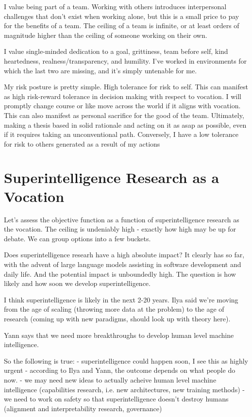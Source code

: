 \documentclass{article}
\begin{document}
I value being part of a team. Working with others introduces interpersonal challenges that don't exist when working alone, but this is a small price to pay for the benefits of a team. The ceiling of a team is infinite, or at least orders of magnitude higher than the ceiling of someone working on their own.

I value single-minded dedication to a goal, grittiness, team before self, kind heartedness, realness/transparency, and humility. I've worked in environments for which the last two are missing, and it's simply untenable for me.

My risk posture is pretty simple. High tolerance for risk to self. This can manifest as high risk-reward tolerance in decision making with respect to vocation. I will promptly change course or like move across the world if it aligns with vocation. This can also manifest as personal sacrifice for the good of the team. Ultimately, making a thesis based in solid rationale and acting on it as asap as possible, even if it requires taking an unconventional path. Conversely, I have a low tolerance for risk to others generated as a result of my actions

\section*{Superintelligence Research as a Vocation}

Let's assess the objective function as a function of superintelligence research as the vocation. The ceiling is undeniably high - exactly how high may be up for debate. We can group options into a few buckets.


Does superintelligence researh have a high absolute impact? It clearly has so far, with the advent of large language models assisting in software development and daily life. And the potential impact is unboundedly high. The question is how likely and how soon we develop superintelligence.

I think superintelligence is likely in the next 2-20 years. Ilya said we're moving from the age of scaling (throwing more data at the problem) to the age of research (coming up with new paradigms, should look up with theory here).

Yann says that we need more breakthroughs to develop human level machine intelligence.

So the following is true:
- superintelligence could happen soon, I see this as highly urgent
- according to Ilya and Yann, the outcome depends on what people do now.
  - we may need new ideas to actually acheive human level machine intelligence (capabilities research, i.e. new architectures, new training methods)
  - we need to work on safety so that superintelligence doesn't destroy humans (alignment and interpretability research, governance)
\end{document}
